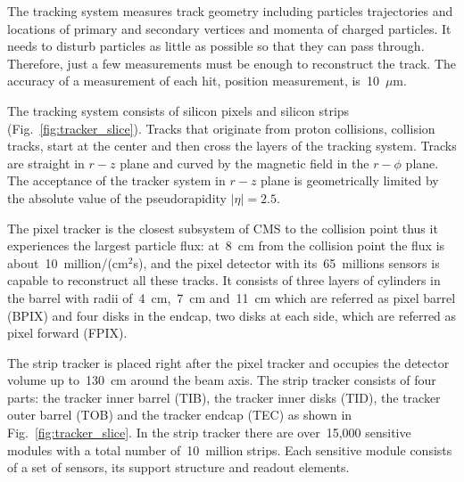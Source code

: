 The tracking system measures track geometry including particles trajectories and locations of primary and secondary vertices and momenta of charged particles. It needs to disturb particles as little as possible so that they can pass through. Therefore, just a few measurements must be enough to reconstruct the track. The accuracy of a measurement of each hit, position measurement, is~10~$\mu$m.

The tracking system consists of silicon pixels and silicon strips (Fig.~\ref{fig:tracker_slice}). Tracks that originate from proton collisions, collision tracks, start at the center and then cross the layers of the tracking system. Tracks are straight in $r-z$ plane and curved by the magnetic field in the $r-\phi$ plane. The acceptance of the tracker system in $r-z$ plane is geometrically limited by the absolute value of the pseudorapidity $|\eta|=2.5$.

The pixel tracker is the closest subsystem of CMS to the collision point thus it experiences the largest particle flux: at~8~cm from the collision point the flux is about~10~million/(cm$^2$s), and the pixel detector with its~65~millions sensors is capable to reconstruct all these tracks. It consists of three layers of cylinders in the barrel with radii of~4~cm,~7~cm and~11~cm which are referred as pixel barrel (BPIX) and four disks in the endcap, two disks at each side, which are referred as pixel forward (FPIX). 


The strip tracker is placed right after the pixel tracker and occupies the detector volume up to~130~cm around the beam axis. The strip tracker consists of four parts: the tracker inner barrel (TIB), the tracker inner disks (TID), the tracker outer barrel (TOB) and the tracker endcap (TEC) as shown in Fig.~\ref{fig:tracker_slice}. In the strip tracker there are over~15,000 sensitive modules with a total number of~10~million strips. Each sensitive module consists of a set of sensors, its support structure and readout elements.



